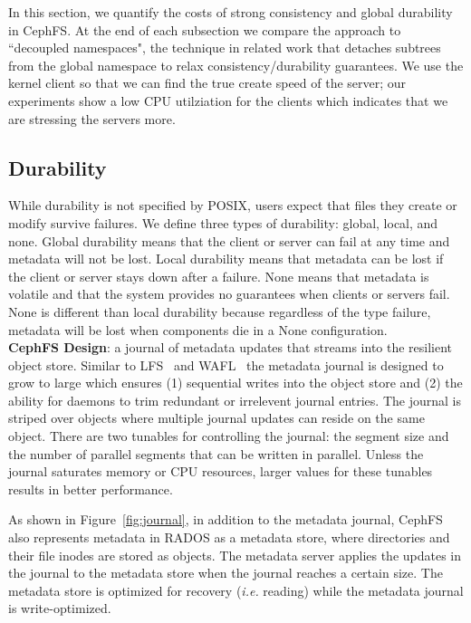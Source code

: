 In this section, we quantify the costs of strong consistency and global
durability in CephFS. At the end of each subsection we compare the approach to
``decoupled namespaces", the technique in related work that detaches subtrees
from the global namespace to relax consistency/durability guarantees.  We use
the kernel client so that we can find the true create speed of the server; our
experiments show a low CPU utilziation for the clients which indicates that we
are stressing the servers more. 

\subsection{Durability}
\label{sec:durability}

While durability is not specified by POSIX, users expect that files they create
or modify survive failures.  We define three types of durability: global,
local, and none.  Global
durability means that the client or server can fail at any time and metadata
will not be lost. Local durability means that metadata can be lost if the
client or server stays down after a failure. None means that metadata is volatile
and that the system provides no guarantees when clients or servers fail. 
None is different than local durability because regardless of the type failure,
metadata will be lost when components die in a None configuration.\\

\noindent\textbf{CephFS Design}: a journal of metadata updates that streams into
the resilient object store. Similar to LFS~\cite{rosenblum:acm1992-LFS} and
WAFL~\cite{hitz:wtec1994-WAFL} the metadata journal is designed to grow to large which
ensures (1) sequential writes into the object store and (2) the ability for daemons to
trim redundant or irrelevent journal entries.  The journal is striped over
objects where multiple journal updates can reside on the same object. There are
two tunables for controlling the journal: the segment size and the number of
parallel segments that can be written in parallel. Unless the journal saturates 
memory or CPU resources, larger values for these tunables results in better
performance.

As shown in Figure~\ref{fig:journal}, in addition to the metadata journal,
CephFS also represents metadata in RADOS as a metadata store, where directories
and their file inodes are stored as objects.  The metadata server applies the
updates in the journal to the metadata store when the journal reaches a certain
size. The metadata store is optimized for recovery ({\it i.e.} reading) while
the metadata journal is write-optimized.

